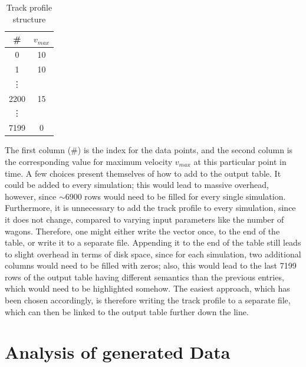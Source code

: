 \bigskip
\begin{table}[H]
	\centering
	\begin{tabular}{*{2}{c}}\toprule
		\# & $v_{max}$ \\ \midrule
		0 & 10 \\
		1 & 10 \\
		\vdots & \\
		2200 & 15 \\
		\vdots & \\
		7199 & 0 \\ 
	\end{tabular}
	\caption{Track profile structure}
	\label{tab:trackprofile}
\end{table}

\noindent
The first column (\#) is the index for the data points, and the second column is the corresponding value for maximum velocity $v_{max}$ at this particular point in time. A few choices present themselves of how to add to the output table. It could be added to every simulation; this would lead to massive overhead, however, since $\sim$6900 rows would need to be filled for every single simulation. Furthermore, it is unnecessary to add the track profile to every simulation, since it does not change, compared to varying input parameters like the number of wagons. Therefore, one might either write the vector once, to the end of the table, or write it to a separate file. Appending it to the end of the table still leads to slight overhead in terms of disk space, since for each simulation, two additional columns would need to be filled with zeros; also, this would lead to the last 7199 rows of the output table having different semantics than the previous entries, which would need to be highlighted somehow. The easiest approach, which has been chosen accordingly, is therefore writing the track profile to a separate file, which can then be linked to the output table further down the line.

\section{Analysis of generated Data}
\label{sec:AnalysisOfGeneratedData}
\TODO{}
